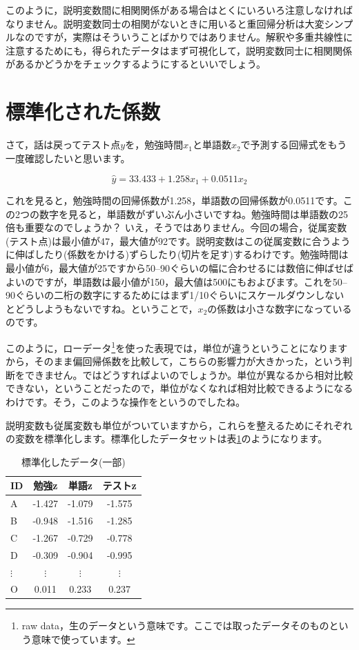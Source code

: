 \documentclass{ltjbook}
\begin{document}
このように，説明変数間に相関関係がある場合はとくにいろいろ注意しなければなりません。説明変数同士の相関がないときに用いると重回帰分析は大変シンプルなのですが，実際はそういうことばかりではありません。解釈や多重共線性に注意するためにも，得られたデータはまず可視化して，説明変数同士に相関関係があるかどうかをチェックするようにするといいでしょう。


\section{標準化された係数}

さて，話は戻ってテスト点$y$を，勉強時間$x_1$と単語数$x_2$で予測する回帰式をもう一度確認したいと思います。

\[ \hat{y} = 33.433+1.258x_1+0.0511x_2 \]

これを見ると，勉強時間の回帰係数が1.258，単語数の回帰係数が0.0511です。この2つの数字を見ると，単語数がずいぶん小さいですね。勉強時間は単語数の25倍も重要なのでしょうか？ いえ，そうではありません。今回の場合，従属変数(テスト点)は最小値が47，最大値が92です。説明変数はこの従属変数に合うように伸ばしたり(係数をかける)ずらしたり(切片を足す)するわけです。勉強時間は最小値が6，最大値が25ですから50--90ぐらいの幅に合わせるには数倍に伸ばせばよいのですが，単語数は最小値が150，最大値は500にもおよびます。これを50--90ぐらいの二桁の数字にするためにはまず1/10ぐらいにスケールダウンしないとどうしようもないですね。ということで，$x_2$の係数は小さな数字になっているのです。

このように，ローデータ\footnote{raw data，生のデータという意味です。ここでは取ったデータそのものという意味で使っています。}を使った表現では，単位が違うということになりますから，そのまま偏回帰係数を比較して，こちらの影響力が大きかった，という判断をできません。ではどうすればよいのでしょうか。単位が異なるから相対比較できない，ということだったので，単位がなくなれば相対比較できるようになるわけです。そう，このような操作をというのでしたね。

説明変数も従属変数も単位がついていますから，これらを整えるためにそれぞれの変数を標準化します。標準化したデータセットは表\ref{tbl:08_03}のようになります。

\begin{table}[ht]
	\caption{標準化したデータ(一部)}
	\centering
	\begin{tabular}[t]{l|ccc}
		\hline
		ID & 勉強z & 単語z & テストz \\
		\hline
		A & -1.427 & -1.079 & -1.575 \\
		B & -0.948 & -1.516 & -1.285 \\
		C & -1.267 & -0.729 & -0.778 \\
		D & -0.309 & -0.904 & -0.995 \\
		$\vdots$ & $\vdots$ & $\vdots$ & $\vdots$ \\
		O & 0.011 & 0.233 & 0.237 \\
		\hline
	\end{tabular}
	\label{tbl:08_03}
\end{table}
\end{document}
